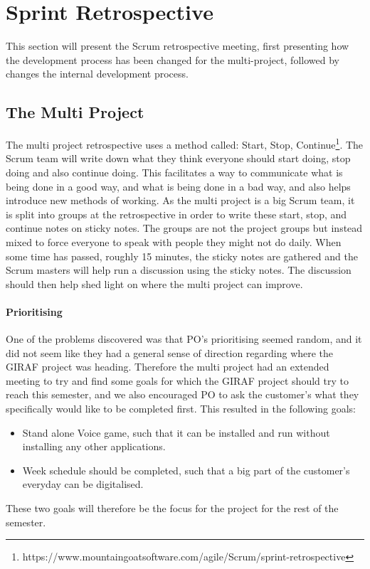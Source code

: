 \section{Sprint Retrospective}
This section will present the Scrum retrospective meeting, first presenting how the development process has been changed for the multi-project, followed by changes the internal development process.

\subsection{The Multi Project}
The multi project retrospective uses a method called: Start, Stop, Continue\footnote{https://www.mountaingoatsoftware.com/agile/Scrum/sprint-retrospective}.
The Scrum team will write down what they think everyone should start doing, stop doing and also continue doing. 
This facilitates a way to communicate what is being done in a good way, and what is being done in a bad way, and also helps introduce new methods of working.
As the multi project is a big Scrum team, it is split into groups at the retrospective in order to write these start, stop, and continue notes on sticky notes.
The groups are not the project groups but instead mixed to force everyone to speak with people they might not do daily.
When some time has passed, roughly 15 minutes, the sticky notes are gathered and the Scrum masters will help run a discussion using the sticky notes.
The discussion should then help shed light on where the multi project can improve.

\paragraph{Prioritising} One of the problems discovered was that PO's prioritising seemed random, and it did not seem like they had a general sense of direction regarding where the GIRAF project was heading.
Therefore the multi project had an extended meeting to try and find some goals for which the GIRAF project should try to reach this semester, and we also encouraged PO to ask the customer's what they specifically would like to be completed first.
This resulted in the following goals:
\begin{itemize}
	\item Stand alone Voice game, such that it can be installed and run without installing any other applications.
	\item Week schedule should be completed, such that a big part of the customer's everyday can be digitalised.
\end{itemize}
These two goals will therefore be the focus for the project for the rest of the semester. 

